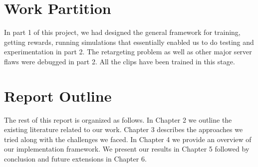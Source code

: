 \section {Work Partition}
In part 1 of this project, we had designed the general framework for training, getting rewards, running simulations that essentially enabled us to do testing and experimentation in part 2. The retargeting problem as well as other major server flaws were debugged in part 2. All the clips have been trained in this stage.

\section{Report Outline}
The rest of this report is organized as follows. In Chapter 2 we outline the existing literature related to our work. Chapter 3 describes the approaches we tried along with the challenges we faced. In Chapter 4 we provide an overview of our implementation framework. We present our results in Chapter 5 followed by conclusion and future extensions in Chapter 6.